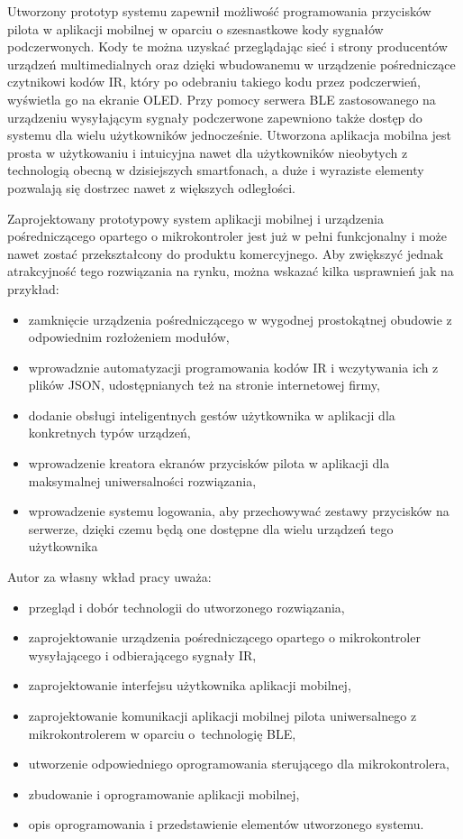 \documentclass[12pt,twoside]{article}
\begin{document}
Utworzony prototyp systemu zapewnił możliwość programowania przycisków pilota w aplikacji mobilnej w oparciu o szesnastkowe kody sygnałów podczerwonych. Kody te można uzyskać przeglądając sieć i strony producentów urządzeń multimedialnych oraz dzięki wbudowanemu w urządzenie pośredniczące czytnikowi kodów IR, który po odebraniu takiego kodu przez podczerwień, wyświetla go na ekranie OLED. Przy pomocy serwera BLE zastosowanego na urządzeniu wysyłającym sygnały podczerwone zapewniono także dostęp do systemu dla wielu użytkowników jednocześnie. Utworzona aplikacja mobilna jest prosta w użytkowaniu i intuicyjna nawet dla użytkowników nieobytych z technologią obecną w dzisiejszych smartfonach, a duże i wyraziste elementy pozwalają się dostrzec nawet z większych odległości.

Zaprojektowany prototypowy system aplikacji mobilnej i urządzenia pośredniczącego opartego o mikrokontroler jest już w pełni funkcjonalny i może nawet zostać przekształcony do produktu komercyjnego. Aby zwiększyć jednak atrakcyjność tego rozwiązania na rynku, można wskazać kilka usprawnień jak na przykład:
\begin{itemize}[label=-,labelsep=0.4cm,leftmargin=0.65cm]
   \item zamknięcie urządzenia pośredniczącego w wygodnej prostokątnej obudowie z odpowiednim rozłożeniem modułów,
   \item wprowadznie automatyzacji programowania kodów IR i wczytywania ich z plików JSON, udostępnianych też na stronie internetowej firmy,
   \item dodanie obsługi inteligentnych gestów użytkownika w aplikacji dla konkretnych typów urządzeń,
   \item wprowadzenie kreatora ekranów przycisków pilota w aplikacji dla maksymalnej uniwersalności rozwiązania,
   \item wprowadzenie systemu logowania, aby przechowywać zestawy przycisków na serwerze, dzięki czemu będą one dostępne dla wielu urządzeń tego użytkownika
   
\end{itemize}

Autor za własny wkład pracy uważa: 
\begin{itemize}[label=-,labelsep=0.4cm,leftmargin=0.65cm]
   \item przegląd i dobór technologii do utworzonego rozwiązania,
   \item zaprojektowanie urządzenia pośredniczącego opartego o mikrokontroler wysyłającego i odbierającego sygnały IR,
   \item zaprojektowanie interfejsu użytkownika aplikacji mobilnej,
   \item zaprojektowanie komunikacji aplikacji mobilnej pilota uniwersalnego z mikrokontrolerem w oparciu o~technologię BLE,
   \item utworzenie odpowiedniego oprogramowania sterującego dla mikrokontrolera,
   \item zbudowanie i oprogramowanie aplikacji mobilnej,
   \item opis oprogramowania i przedstawienie elementów utworzonego systemu.
   
\end{itemize}

\clearpage
{}



\clearpage

\makesummary
\end{document}

